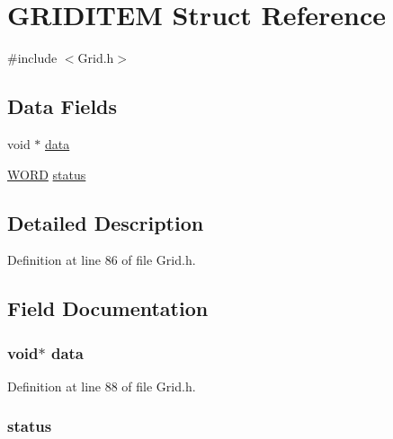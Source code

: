 \hypertarget{struct_g_r_i_d_i_t_e_m}{}\section{G\+R\+I\+D\+I\+T\+E\+M Struct Reference}
\label{struct_g_r_i_d_i_t_e_m}


{\ttfamily \#include $<$Grid.\+h$>$}

\subsection*{Data Fields}
\begin{DoxyCompactItemize}
\item 
void $\ast$ \hyperlink{struct_g_r_i_d_i_t_e_m_a735984d41155bc1032e09bece8f8d66d}{data}
\item 
\hyperlink{_generic_type_defs_8h_a2b0e863dadf920709ec53d9088ee7c91}{W\+O\+R\+D} \hyperlink{struct_g_r_i_d_i_t_e_m_ae9b729593cbf756556fd43454ade403f}{status}
\end{DoxyCompactItemize}


\subsection{Detailed Description}


Definition at line 86 of file Grid.\+h.



\subsection{Field Documentation}
\hypertarget{struct_g_r_i_d_i_t_e_m_a735984d41155bc1032e09bece8f8d66d}{}
\subsubsection[{data}]{\setlength{\rightskip}{0pt plus 5cm}void$\ast$ data}\label{struct_g_r_i_d_i_t_e_m_a735984d41155bc1032e09bece8f8d66d}


Definition at line 88 of file Grid.\+h.

\hypertarget{struct_g_r_i_d_i_t_e_m_ae9b729593cbf756556fd43454ade403f}{}
\subsubsection[{status}]{ status}\label{struct_g_r_i_d_i_t_e_m_ae9b729593cbf756556fd43454ade403f}


